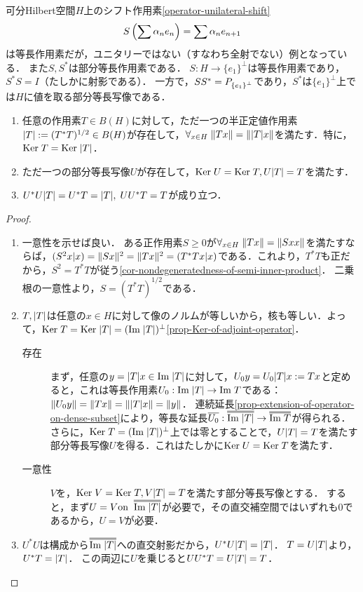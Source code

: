 \documentclass[uplatex,dvipdfmx]{jsreport}
\begin{document}
\begin{example}
    可分Hilbert空間$H$上のシフト作用素\ref{operator-unilateral-shift}
    \[S\left(\sum\alpha_ne_n\right)=\sum\alpha_ne_{n+1}\]
    は等長作用素だが，ユニタリーではない（すなわち全射でない）例となっている．
    また$S,S^*$は部分等長作用素である．
    $S:H\to\{e_1\}^\perp$は等長作用素であり，$S^*S=I$（たしかに射影である）．
    一方で，$SS^*=P_{\left\{e_1\right\}^\perp}$であり，$S^*$は$\{e_1\}^\perp$上では$H$に値を取る部分等長写像である．
\end{example}

\begin{theorem}\mbox{}
    \begin{enumerate}
        \item 任意の作用素$T\in B(H)$に対して，ただ一つの半正定値作用素$\lvert T\rvert:=(T^*T)^{1/2}\in B(H)$が存在して，$\forall_{x\in H}\;\|Tx\|=\|\lvert T\rvert x\|$を満たす．特に，$\mathrm{Ker}\; T=\mathrm{Ker}\;\lvert T\rvert$．
        \item ただ一つの部分等長写像$U$が存在して，$\mathrm{Ker}\; U=\mathrm{Ker}\; T,U\lvert T\rvert=T$を満たす．
        \item $U^*U\lvert T\rvert=U^*T=\lvert T\rvert,\;UU^*T=T$が成り立つ．
    \end{enumerate}
\end{theorem}
\begin{proof}\mbox{}
    \begin{enumerate}
        \item 一意性を示せば良い．
        ある正作用素$S\ge0$が$\forall_{x\in H}\;\|Tx\|=\|Sxx\|$を満たすならば，$(S^2x|x)=\|Sx\|^2=\|Tx\|^2=(T^*Tx|x)$である．これより，$T^*T$も正だから，$S^2=T^*T$が従う\ref{cor-nondegeneratedness-of-semi-inner-product}．
        二乗根の一意性より，$S=(T^*T)^{1/2}$である．
        \item $T,\lvert T\rvert$は任意の$x\in H$に対して像のノルムが等しいから，核も等しい．よって，$\mathrm{Ker}\; T=\mathrm{Ker}\;\lvert T\rvert=(\mathrm{Im}\;\lvert T\rvert)^\perp$\ref{prop-Ker-of-adjoint-operator}．
        \begin{description}
            \item[存在] まず，任意の$y=\lvert T\rvert x\in\mathrm{Im}\;\lvert T\rvert$に対して，$U_0y=U_0\lvert T\rvert x:=Tx$と定めると，これは等長作用素$U_0:\mathrm{Im}\;\lvert T\rvert\to\mathrm{Im}\; T$である：$\|U_0y\|=\|Tx\|=\|\lvert T\rvert x\|=\|y\|$．
            連続延長\ref{prop-extension-of-operator-on-dense-subset}により，等長な延長$\o{U_0}:\oo{\Im\abs{T}}\to\oo{\Im T}$が得られる．
            さらに，$\mathrm{Ker}\; T=(\mathrm{Im}\;\lvert T\rvert)^\perp$上では零とすることで，$U\lvert T\rvert=T$を満たす部分等長写像$U$を得る．これはたしかに$\mathrm{Ker}\; U=\mathrm{Ker}\; T$を満たす．
            \item[一意性] 
            $V$を，$\mathrm{Ker}\; V=\mathrm{Ker}\; T,V\lvert T\rvert=T$を満たす部分等長写像とする．
            すると，まず$U=V\on\;\oo{\Im\abs{T}}$が必要で，その直交補空間ではいずれも$0$であるから，$U=V$が必要．
        \end{description}
        \item $U^*U$は構成から$\oo{\Im\abs{T}}$への直交射影だから，$U^*U\lvert T\rvert=\lvert T\rvert$．
        $T=U\lvert T\rvert$より，$U^*T=\lvert T\rvert$．
        この両辺に$U$を乗じると$UU^*T=U\lvert T\rvert=T$．
    \end{enumerate}
\end{proof}
\end{document}

